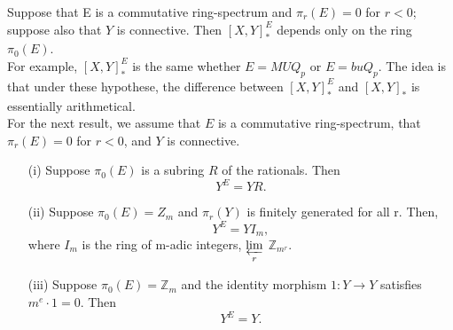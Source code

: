 \documentclass[../main]{subfiles}
\begin{document}
   \begin{proposition} \label{prop:p3ch14.5}
     Suppose that E is a commutative ring-spectrum and $ \pi_{r}(E)=0$ for $r<0$; suppose also that $Y$ is connective. Then  $\left[ X,Y \right] ^E_{\ast}$ depends only on the ring $ \pi_{0}(E)$.\\
     For example,  $\left[ X,Y \right] ^E_{\ast}$ is the same whether $E=MUQ_{p}$ or $E=buQ_{p}$. The idea is that under these hypothese, the difference between $\left[ X,Y \right] ^E_{\ast}$ and $\left[ X,Y \right] _{\ast}$ is essentially arithmetical. \\
For the next result, we assume that $E$ is a commutative ring-spectrum, that  $ \pi_{r}(E)=0$ for $r<0$, and  $Y$ is connective.\\
\end{proposition}
 \begin{theorem} \label{thm:p3ch14.6}
\begin{enumerate} 
  \item [(i)] Suppose $ \pi_{0}(E)$ is a subring $R$ of the rationals. Then  $$
    Y^E = YR.
  $$ 
\item [(ii)] Suppose $ \pi_{0}(E)=Z_{m}$ and  $\pi_{r}(Y)$ is finitely generated for all r. Then, 
  $$
    Y^E = YI_{m},
  $$ 
  where $I_{m}$ is the ring of m-adic integers, $\displaystyle{\varprojlim_r}$ $\mathbb{Z}_{m^r}$. 
\item [(iii)] Suppose $ \pi_{0}(E)=\mathbb{Z}_{m}$ and the identity morphism $1\colon Y \to Y$ satisfies $m^e\cdot 1=0$. Then 
  $$
    Y^E = Y.
  $$ 
\end{enumerate}
\end{theorem}
   
\end{document}
